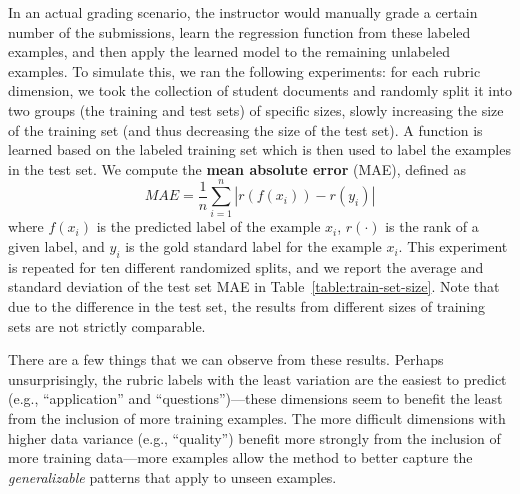 In an actual grading scenario, the instructor would manually grade a
certain number of the submissions, learn the regression function from these
labeled examples, and then apply the learned model to the remaining
unlabeled examples. To simulate this, we ran the following experiments: for
each rubric dimension, we took the collection of student documents and
randomly split it into two groups (the training and test sets) of specific
sizes, slowly increasing the size of the training set (and thus decreasing
the size of the test set). A function is learned based on the labeled
training set which is then used to label the examples in the test set. We
compute the \textbf{mean absolute error} (MAE), defined as
\[
MAE = \frac{1}{n} \sum_{i=1}^n | r(f(x_i)) - r(y_i) |
\]
where $f(x_i)$ is the predicted label of the example $x_i$, $r(\cdot)$ is
the rank of a given label, and $y_i$ is the gold standard label for the
example $x_i$. This experiment is repeated for ten different randomized
splits, and we report the average and standard deviation of the test set
MAE in Table~\ref{table:train-set-size}. Note that due to the difference in the
test set, the results from different sizes of training sets are not strictly
comparable.



There are a few things that we can observe from these results.  Perhaps
unsurprisingly, the rubric labels with the least variation are the easiest
to predict (e.g., ``application'' and ``questions'')---these dimensions
seem to benefit the least from the inclusion of more training examples.
The more difficult dimensions with higher data variance (e.g.,
``quality'') benefit more strongly from the inclusion of more training
data---more examples allow the method to better capture the
\emph{generalizable} patterns that apply to unseen examples.


